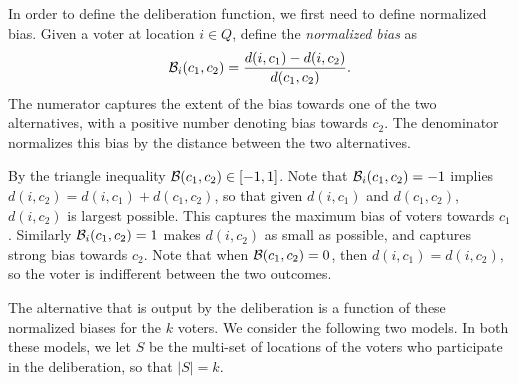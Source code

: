 In order to define the deliberation function, we first need to define normalized bias. Given a voter at location $i \in Q$, define the {\em normalized bias} as
$$ \mathcal{B}_i(c_1,c_2) = \frac{d(i,c_1) - d(i,c_2)}{d(c_1,c_2)}.$$
The numerator captures the extent of the bias towards one of the two alternatives, with a positive number denoting bias towards $c_2$. The denominator normalizes this bias by the distance between the two alternatives. 

By the triangle inequality $\mathcal{B}(c_1,c_2) \in [-1,1]$. Note that $\mathcal{B}_i(c_1,c_2) = -1$ implies $d(i,c_2) = d(i,c_1) + d(c_1,c_2)$, so that given $d(i,c_1)$ and $d(c_1,c_2)$, $d(i,c_2)$ is largest possible. This captures the maximum bias of voters towards $c_1$. Similarly $\mathcal{B}_i(c_1,c_2) = 1$ makes $d(i,c_2)$ as small as possible, and captures strong bias towards $c_2$. Note that when $\mathcal{B}(c_1,c_2) = 0$, then $d(i,c_1) = d(i,c_2)$, so the voter is indifferent between the two outcomes.

The alternative that is output by the deliberation is a function of these normalized biases for the $k$ voters. We consider the following two models. In both these models, we let $S$ be the multi-set of locations of the voters who participate in the deliberation, so that $|S| = k$.

